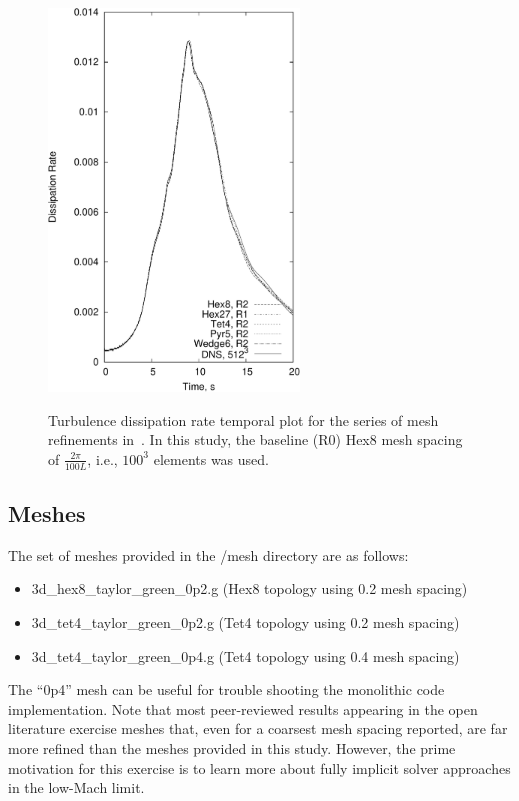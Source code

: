\documentclass{article}
\begin{document}
\begin{figure}[!htbp]
  \centering
  {
   \includegraphics[height=4.0in]{images/tg_diss_hex8_tet4_pyr5_wedge6_R2_CU-crop.pdf}
  }
  \caption{Turbulence dissipation rate temporal plot for the series of mesh refinements in~\cite{domino2019}. In this
study, the baseline (R0) Hex8 mesh spacing of $\frac{2\pi}{100 L}$, i.e., $100^3$ elements was used.}
  \label{fig:ek}
\end{figure}

\subsection{Meshes}
The set of meshes provided in the /mesh directory are as follows:

\begin{itemize}
	\item 3d\_hex8\_taylor\_green\_0p2.g (Hex8 topology using 0.2 mesh spacing)
	\item 3d\_tet4\_taylor\_green\_0p2.g (Tet4 topology using 0.2 mesh spacing)
	\item 3d\_tet4\_taylor\_green\_0p4.g (Tet4 topology using 0.4 mesh spacing)
\end{itemize}
The ``0p4'' mesh can be useful for trouble shooting the monolithic  code implementation. Note that most peer-reviewed results 
appearing in the open literature exercise meshes that, even for a coarsest mesh spacing reported, are far more refined than 
the meshes provided in this study. However, the prime motivation for this exercise is to learn more about fully implicit solver approaches
in the low-Mach limit.
\end{document}
